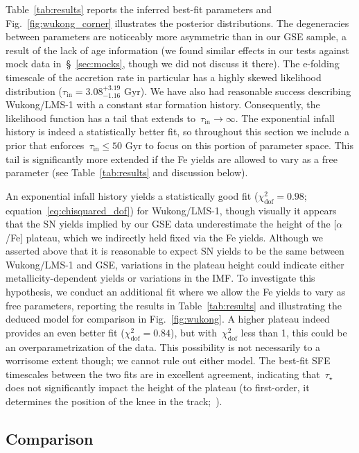 \documentclass[foo.tex]{subfiles}
\begin{document}
Table~\ref{tab:results} reports the inferred best-fit parameters and
Fig.~\ref{fig:wukong_corner} illustrates the posterior distributions.
The degeneracies between parameters are noticeably more asymmetric than in our
GSE sample, a result of the lack of age information (we found similar effects
in our tests against mock data in~\S~\ref{sec:mocks}, though we did not discuss
it there).
The e-folding timescale of the accretion rate in particular has a highly skewed
likelihood distribution ($\tau_\text{in} = 3.08^{+3.19}_{-1.16}$ Gyr).
We have also had reasonable success describing Wukong/LMS-1 with a constant
star formation history.
Consequently, the likelihood function has a tail that extends
to~$\tau_\text{in} \rightarrow \infty$.
The exponential infall history is indeed a statistically better fit, so
throughout this section we include a prior that
enforces~$\tau_\text{in} \leq 50$ Gyr to focus on this portion of parameter
space.
This tail is significantly more extended if the Fe yields are allowed to vary
as a free parameter (see Table~\ref{tab:results} and discussion below).
\par
An exponential infall history yields a statistically good fit
($\chi_\text{dof}^2 = 0.98$; equation~\ref{eq:chisquared_dof}) for Wukong/LMS-1,
though visually it appears that the SN yields implied by our GSE data
underestimate the height of the [$\alpha$/Fe] plateau, which we indirectly
held fixed via the Fe yields.
Although we asserted above that it is reasonable to expect SN yields to be the
same between Wukong/LMS-1 and GSE, variations in the plateau height could
indicate either metallicity-dependent yields or variations in the IMF.
To investigate this hypothesis, we conduct an additional fit where we allow
the Fe yields to vary as free parameters, reporting the results in
Table~\ref{tab:results} and illustrating the deduced model for comparison in
Fig.~\ref{fig:wukong}.
A higher plateau indeed provides an even better fit
($\chi_\text{dof}^2 = 0.84$), but with~$\chi_\text{dof}^2$ less than 1, this
could be an overparametrization of the data.
This possibility is not necessarily to a worrisome extent though; we cannot
rule out either model.
The best-fit SFE timescales between the two fits are in excellent agreement,
indicating that~$\tau_\star$ does not significantly impact the height of the
plateau (to first-order, it determines the position of the knee in the
track;~\citealp{Weinberg2017}).

\subsection{Comparison}
\label{sec:h3:comparison}
\end{document}
